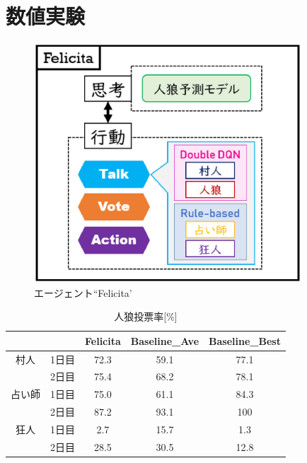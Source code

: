 \newpage
\changeindent{0cm}
\section{数値実験}
\label{sec:exp}
\changeindent{2cm}

\begin{figure}[t]
     \begin{center}
       \includegraphics[width = 10cm,clip]{./fig/04.exp/felicita.eps}
      \end{center}
      \caption{エージェント``Felicita'}
     \label{fig:06_fel}
\end{figure}


\begin{table}[t]
		\caption{人狼投票率[\%]}
		\label{tb:06_result1}
		\vspace{3mm}
		\centering
		\begin{tabular}{|c|c|c|c|c|}
			\hline
			\multicolumn{2}{|c|}{}&Felicita&Baseline\_Ave&Baseline\_Best\\
			\hline
			村人&1日目&72.3&59.1&77.1\\
			\cline{2-5}
			&2日目&75.4&68.2&78.1\\
			\hline
			占い師&1日目&75.0&61.1&84.3\\
			\cline{2-5}
			&2日目&87.2&93.1&100\\
			\hline
			狂人&1日目&2.7&15.7&1.3\\
			\cline{2-5}
			&2日目&28.5&30.5&12.8\\
			\hline
		\end{tabular} 
\end{table}





